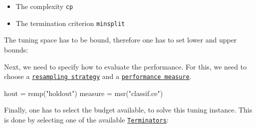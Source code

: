 \documentclass[]{article}
\newenvironment{Shaded}{}{}
\newcommand{\DataTypeTok}[1]{#1}
\newcommand{\DecValTok}[1]{#1}
\newcommand{\FloatTok}[1]{#1}
\newcommand{\KeywordTok}[1]{\textcolor[rgb]{0.00,0.00,1.00}{#1}}
\newcommand{\NormalTok}[1]{#1}
\newcommand{\OperatorTok}[1]{#1}
\newcommand{\StringTok}[1]{\textcolor[rgb]{0.00,0.50,0.50}{#1}}
\providecommand{\tightlist}{%
  \setlength{\itemsep}{0pt}\setlength{\parskip}{0pt}}
\renewenvironment{Shaded} {\begin{snugshade}\small} {\end{snugshade}}
\begin{document}
\begin{itemize}
\tightlist
\item
  The complexity \texttt{cp}
\item
  The termination criterion \texttt{minsplit}
\end{itemize}

The tuning space has to be bound, therefore one has to set lower and upper bounds:

\begin{Shaded}
\end{Shaded}

Next, we need to specify how to evaluate the performance.
For this, we need to choose a \href{https://mlr3.mlr-org.com/reference/Resampling.html}{\texttt{resampling\ strategy}} and a \href{https://mlr3.mlr-org.com/reference/Measure.html}{\texttt{performance\ measure}}.

\begin{Shaded}
\begin{Highlighting}[]
\NormalTok{hout =}\StringTok{ }\KeywordTok{rsmp}\NormalTok{(}\StringTok{"holdout"}\NormalTok{)}
\NormalTok{measure =}\StringTok{ }\KeywordTok{msr}\NormalTok{(}\StringTok{"classif.ce"}\NormalTok{)}
\end{Highlighting}
\end{Shaded}

Finally, one has to select the budget available, to solve this tuning instance.
This is done by selecting one of the available \href{https://mlr3tuning.mlr-org.com/reference/Terminator.html}{\texttt{Terminators}}:
\end{document}
